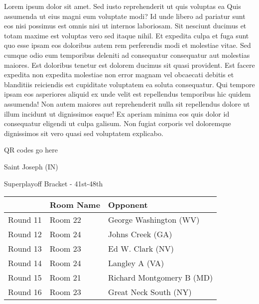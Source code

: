 \documentclass{article}%
\begin{document}
\vspace*{8pt}%
\linebreak%
\newline%
\newline%
    Lorem ipsum dolor sit amet. Sed iusto reprehenderit ut quis voluptas ea Quis assumenda ut eius magni eum voluptate modi? Id unde libero ad pariatur sunt eos nisi possimus est omnis nisi ut internos laboriosam. Sit nesciunt ducimus et totam maxime est voluptas vero sed itaque nihil. Et expedita culpa et fuga sunt quo esse ipsam eos doloribus autem rem perferendis modi et molestiae vitae.\newline%
\newline%
    Sed cumque odio eum temporibus deleniti ad consequatur consequatur aut molestias maiores. Est doloribus tenetur est dolorem ducimus sit quasi provident. Est facere expedita non expedita molestiae non error magnam vel obcaecati debitis et blanditiis reiciendis est cupiditate voluptatem ea soluta consequatur. Qui tempore ipsam eos asperiores aliquid ex unde velit est repellendus temporibus hic quidem assumenda!\newline%
\newline%
    Non autem maiores aut reprehenderit nulla sit repellendus dolore ut illum incidunt ut dignissimos eaque! Ex aperiam minima eos quis dolor id consequatur eligendi ut culpa galisum. Non fugiat corporis vel doloremque dignissimos sit vero quasi sed voluptatem explicabo.\newline%
\newline%
\vspace*{30pt}%
\begin{center}%
\begin{Huge}%
QR codes go here%
\end{Huge}%
\end{center}%
\newpage%
\begin{center}%
\begin{Huge}%
Saint Joseph (IN)%
\end{Huge}%
\vspace*{8pt}%
\linebreak%
\begin{Large}%
Superplayoff Bracket {-} 41st{-}48th%
\end{Large}%
\end{center}%
%
\begin{tabularx}{\textwidth}{|c|Y|Y|}%
\hline%
&Room Name&Opponent\\%
\hline%
Round 11&Room 22&George Washington (WV)\\%
Round 12&Room 24&Johns Creek (GA)\\%
Round 13&Room 23&Ed W. Clark (NV)\\%
Round 14&Room 24&Langley A (VA)\\%
Round 15&Room 21&Richard Montgomery B (MD)\\%
Round 16&Room 23&Great Neck South (NY)\\%
\hline%
\end{tabularx}%
\end{document}
